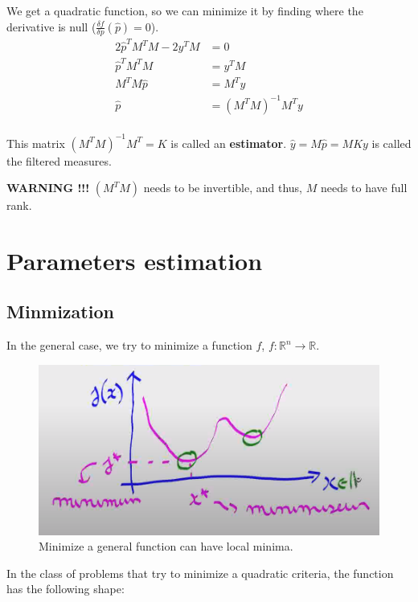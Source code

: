 We get a quadratic function, so we can minimize it by finding where the derivative is null ($\frac{\delta f}{\delta p}(\hat{p}) = 0$).
\begin{equation}
\begin{split}
2 \hat{p}^T M^TM -2y^T M &= 0 \\
\hat{p}^T M^TM &= y^TM \\
M^T M \hat{p} &= M^T y \\
\hat{p} &= (M^T M)^{-1} M^T y \\
\end{split}
\end{equation}

This matrix $(M^T M)^{-1} M^T = K$ is called an \textbf{estimator}.
$\hat{y} = M \hat{p} = M K y$ is called the filtered measures.



\textbf{WARNING !!!} $(M^TM)$ needs to be invertible, and thus, $M$ needs to have full rank.

\section{Parameters estimation}
\subsection{Minmization}

In the general case, we try to minimize a function $f$, $f: \mathbb{R}^n \longrightarrow \mathbb{R}$.
\begin{figure}[H]
    \centering
    \includegraphics[scale=0.3]{content/minimization.png}
    \caption{Minimize a general function can have local minima.}
    \label{fig:minmization}
\end{figure}

In the class of problems that try to minimize a quadratic criteria, the function has the following shape:


